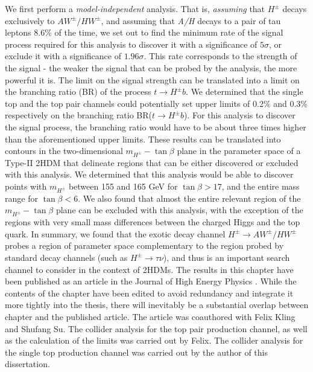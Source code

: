 We first perform a \emph{model-independent} analysis. That is, \emph{assuming} that $H^\pm$ decays exclusively to $AW^\pm/HW^\pm$, and assuming that \emph{A/H} decays to a pair of tau leptons 8.6\% of the time, we set out to find the minimum rate of the signal process required for this analysis to discover it with a significance of $5\sigma$, or exclude it with a significance of $1.96\sigma$. This rate corresponds to the strength of the signal - the weaker the signal that can be probed by the analysis, the more powerful it is. The limit on the signal strength can be translated into a limit on the branching ratio (BR) of the process $t\rightarrow H^\pm b$. We determined that the single top and the top pair channels could potentially set upper limits of 0.2\% and 0.3\% respectively on the branching ratio BR($t\rightarrow H^\pm b$). For this analysis to discover the signal process, the branching ratio would have to be about three times higher than the aforementioned upper limits. These results can be translated into contours in the two-dimensional $m_{H^\pm}-\tan\beta$ plane in the parameter space of a Type-II 2HDM that delineate regions that can be either discovered or excluded with this analysis. We determined that this analysis would be able to discover points with $m_{H^\pm}$ between 155 and 165 GeV for $\tan\beta > 17$, and the entire mass range for $\tan\beta < 6$. We also found that almost the entire relevant region of the $m_{H^\pm}-\tan\beta$ plane can be excluded with this analysis, with the exception of the regions with very small mass differences between the charged Higgs and the top quark. In summary, we found that the exotic decay channel $H^\pm\rightarrow AW^\pm/HW^\pm$ probes a region of parameter space complementary to the region probed by standard decay channels (such as $H^\pm\rightarrow \tau\nu$), and thus is an important search channel to consider in the context of 2HDMs.
The results in this chapter have been published as an article in the Journal of High Energy Physics \citep{Kling2015c}. While the contents of the chapter have been edited to avoid redundancy and integrate it more tightly into the thesis, there will inevitably be a substantial overlap between chapter and the published article. The article was coauthored with Felix Kling and Shufang Su. The collider analysis for the top pair production channel, as well as the calculation of the limits  was carried out by Felix. The collider analysis for the single top production channel was carried out by the author of this dissertation.  

